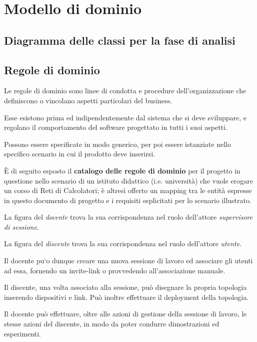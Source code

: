\documentclass[../main.tex]{subfiles}
\begin{document}
\chapter{Modello di dominio}
\newpage
\section{Diagramma delle classi per la fase di analisi}
\figure[H]
\centering

\endfigure
\vfill\newpage
\section{Regole di dominio}
Le regole di dominio sono linee di condotta e procedure dell’organizzazione che definiscono o vincolano aspetti particolari del business.

Esse esistono prima ed indipendentemente dal sistema che si deve sviluppare, e regolano il comportamento del software progettato in tutti i suoi aspetti.

Possono essere specificate in modo generico, per poi essere istanziate nello specifico scenario in cui il prodotto deve inserirsi.

\`E di seguito esposto il \textbf{catalogo delle regole di dominio} per il progetto in questione nello scenario di un istituto didattico (i.e. universit\`a) che vuole erogare un corso di Reti di Calcolatori; \`e altres\`i offerto un mapping tra le entit\`a espresse in questo documento di progetto e i requisiti esplicitati per lo scenario illustrato.

La figura del \textit{docente} trova la sua corrispondenza nel ruolo dell'attore \textit{supervisore di sessione}.

La figura del \textit{discente} trova la sua corrispondenza nel ruolo dell'attore \textit{utente}.

Il docente pu`o dunque creare una nuova sessione di lavoro ed associare gli utenti ad essa, fornendo un invite-link o provvedendo all'associazione manuale.

Il discente, una volta associato alla sessione, pu\`o disegnare la propria topologia inserendo dispositivi e link. Pu\`o inoltre effettuare il deployment della topologia.

Il docente pu\`o effettuare, oltre alle azioni di gestione della sessione di lavoro, le stesse azioni del discente, in modo da poter condurre dimostrazioni ed esperimenti.
\end{document}
